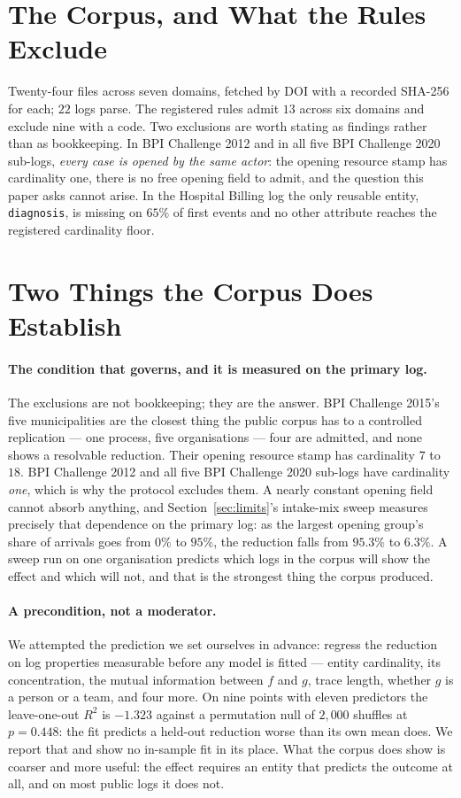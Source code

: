 \documentclass[preprint,12pt]{elsarticle}
\begin{document}
\section{The Corpus, and What the Rules Exclude}
\label{app:exclusions}

Twenty-four files across seven domains, fetched by DOI with a recorded
SHA-256 for each; $22$ logs parse. The registered rules admit $13$ across six
domains and exclude nine with a code. Two exclusions are worth stating as
findings rather than as bookkeeping. In BPI Challenge 2012 and in all five BPI
Challenge 2020 sub-logs, \emph{every case is opened by the same actor}: the
opening resource stamp has cardinality one, there is no free opening field to
admit, and the question this paper asks cannot arise. In the Hospital Billing
log the only reusable entity, \texttt{diagnosis}, is missing on $65\%$ of first
events and no other attribute reaches the registered cardinality floor.

\section{Two Things the Corpus Does Establish}
\label{app:corpusest}

\paragraph{The condition that governs, and it is measured on the primary log.}
The exclusions are not bookkeeping; they are the answer. BPI Challenge 2015's
five municipalities are the closest thing the public corpus has to a
controlled replication --- one process, five organisations --- four are
admitted, and none shows a resolvable reduction. Their opening resource stamp
has cardinality $7$ to $18$. BPI Challenge 2012 and all five BPI Challenge
2020 sub-logs have cardinality \emph{one}, which is why the protocol excludes
them. A nearly constant opening field cannot absorb anything, and
Section~\ref{sec:limits}'s intake-mix sweep measures precisely that dependence
on the primary log: as the largest opening group's share of arrivals goes from
$0\%$ to $95\%$, the reduction falls from $95.3\%$ to $6.3\%$. A sweep run on
one organisation predicts which logs in the corpus will show the effect and
which will not, and that is the strongest thing the corpus produced.

\paragraph{A precondition, not a moderator.}
We attempted the prediction we set ourselves in advance: regress the
reduction on log properties measurable before any model is fitted --- entity
cardinality, its concentration, the mutual information between $f$ and $g$,
trace length, whether $g$ is a person or a team, and four more. On nine points
with eleven predictors the leave-one-out $R^2$ is $-1.323$ against a
permutation null of $2{,}000$ shuffles at $p = 0.448$: the fit predicts a
held-out reduction worse than its own mean does. We report that and show no
in-sample fit in its place. What the corpus does show is coarser and more
useful: the effect requires an entity that predicts the outcome at all, and on
most public logs it does not.
\end{document}
